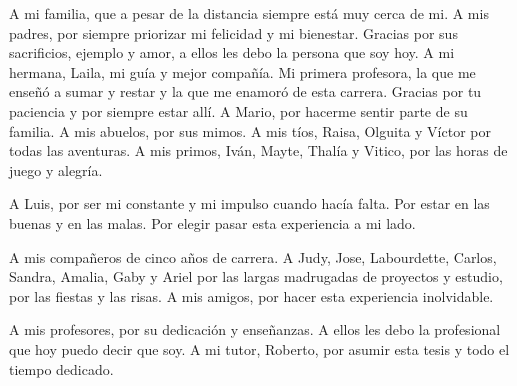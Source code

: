 \begin{acknowledgements}
	A mi familia, que a pesar de la distancia siempre está muy cerca de mi. A mis padres, por siempre priorizar mi felicidad y mi bienestar. Gracias por sus sacrificios, ejemplo y amor, a ellos les debo la persona que soy hoy. A mi hermana, Laila, mi guía y mejor compañía. Mi primera profesora, la que me enseñó a sumar y restar y la que me enamoró de esta carrera. Gracias por tu paciencia y por siempre estar allí. A Mario, por hacerme sentir parte de su familia. A mis abuelos, por sus mimos. A mis tíos, Raisa, Olguita y Víctor por todas las aventuras. A mis primos, Iván, Mayte, Thalía y Vitico, por las horas de juego y alegría.
	
	A Luis, por ser mi constante y mi impulso cuando hacía falta. Por estar en las buenas y en las malas. Por elegir pasar esta experiencia a mi lado.
	
	A mis compañeros de cinco años de carrera. A Judy, Jose, Labourdette, Carlos, Sandra, Amalia, Gaby y Ariel por las largas madrugadas de proyectos y estudio, por las fiestas y las risas. A mis amigos, por hacer esta experiencia inolvidable.
	
	A mis profesores, por su dedicación y enseñanzas. A ellos les debo la profesional que hoy puedo decir que soy. A mi tutor, Roberto, por asumir esta tesis y todo el tiempo dedicado.
\end{acknowledgements}